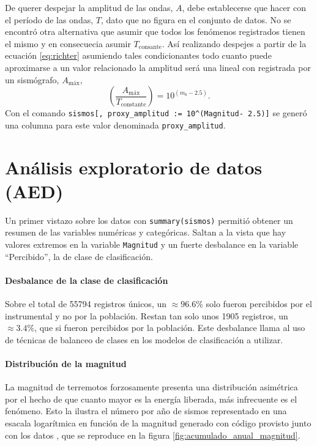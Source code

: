 \documentclass[a4paper]{report}
\begin{document}
De querer despejar la amplitud de las ondas, \(A\), debe establecerse que hacer con el período de las ondas, \(T\), dato que no figura en el conjunto de datos.
No se encontró otra alternativa que asumir que todos los fenómenos registrados tienen el mismo y en consecuecia asumir \(T_\text{consante}\).
Así realizando despejes a partir de la ecuación \ref{eq:richter} asumiendo tales condicionantes todo cuanto puede aproximarse a un valor relacionado la amplitud será una lineal con registrada por un sismógrafo, \(A_\text{máx}\),
\begin{equation}
	\left( \frac{A_\text{máx}}{T_\text{constante}} \right) = 10^{(m_b - 2.5)}.
	\label{eq:linealizacionMagnitud_final} 
\end{equation}
Con el comando \verb'sismos[, proxy_amplitud := 10^(Magnitud- 2.5)]' se generó una columna para este valor denominada \verb'proxy_amplitud'.



\section{Análisis exploratorio de datos (AED)}\label{sec:AED}

Un primer vistazo sobre los datos con \verb'summary(sismos)' permitió obtener un resumen de las variables numéricas y categóricas.
Saltan a la vista que hay valores extremos en la variable \verb'Magnitud' y un fuerte desbalance en la variable ``Percibido'', la de clase de clasificación.


\paragraph{Desbalance de la clase de clasificación}
Sobre el total de 55794 registros únicos, un \(\approx 96.6\%\) solo fueron percibidos por el instrumental y no por la población.
Restan tan solo unos 1905 registros, un \(\approx 3.4\%\), que si fueron percibidos por la población.
Este desbalance llama al uso de técnicas de balanceo de clases en los modelos de clasificación a utilizar.


\paragraph{Distribución de la magnitud}
La magnitud de terremotos forzosamente presenta una distribución asimétrica por el hecho de que cuanto mayor es la energía liberada, más infrecuente es el fenómeno.
Esto la ilustra el número por año de sismos representado en una esacala logarítmica en función de la magnitud generado con código provisto junto con los datos \cite[sección 4.2.1]{daniela_parada_ic-datasets-docencia_nodate}, que se reproduce en la figura \ref{fig:acumulado_anual_magnitud}.
\end{document}
